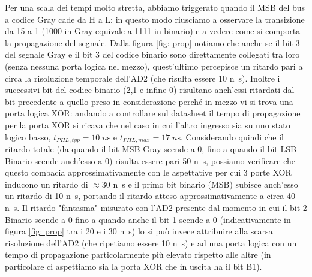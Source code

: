 \documentclass[10pt, a4paper, italian]{article}
\begin{document}
Per una scala dei tempi molto stretta, abbiamo triggerato quando il MSB del bus a codice Gray cade da H a L: in questo modo riusciamo a osservare la transizione da 15 a 1 (1000 in Gray equivale a 1111 in binario) e a vedere come si comporta la propagazione del segnale.
Dalla figura \cref{fig: prop} notiamo che anche se il bit 3 del segnale Gray e il bit 3 del codice binario sono direttamente collegati tra loro (senza nessuna porta logica nel mezzo), quest'ultimo percepisce un ritardo pari a circa la risoluzione temporale dell'AD2 (che risulta essere 10 \si{n\s}).
Inoltre i successivi bit del codice binario (2,1 e infine 0) risultano anch'essi ritardati dal bit precedente a quello preso in considerazione perché in mezzo vi si trova una porta logica XOR: andando a controllare sul datasheet il tempo di propagazione per la porta XOR si ricava che nel caso in cui l'altro ingresso sia su uno stato logico basso, $t_{PHL,typ}=10 \; \si{n\s}$ e $t_{PHL,max}=17 \; \si{n\s}$.
Considerando quindi che il ritardo totale (da quando il bit MSB Gray scende a 0, fino a quando il bit LSB Binario scende anch'esso a 0) risulta essere pari 50 \si{n\s}, possiamo verificare che questo combacia approssimativamente con le aspettative per cui 3 porte XOR inducono un ritardo di $\approx 30$ \si{n\s} e il primo bit binario (MSB) subisce anch'esso un ritardo di 10 \si{n\s}, portando il ritardo atteso approssimativamente a circa 40 \si{n\s}.
Il ritardo "fantasma" misurato con l'AD2 presente dal momento in cui il bit 2 Binario scende a 0 fino a quando anche il bit 1 scende a 0 (indicativamente in figura \cref{fig: prop} tra i 20 e i 30 \si{n\s}) lo si può invece attribuire alla scarsa risoluzione dell'AD2  (che ripetiamo essere 10 \si{n\s}) e ad una porta logica con un tempo di propagazione particolarmente più elevato rispetto alle altre (in particolare ci aspettiamo sia la porta XOR che in uscita ha il bit B1).
\end{document}
